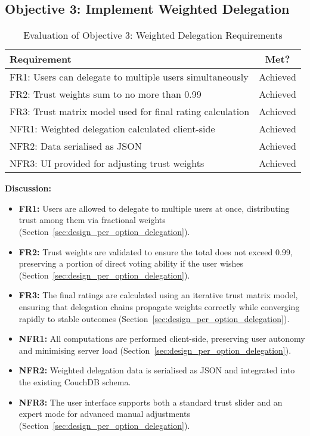 \subsection{Objective 3: Implement Weighted Delegation}

\begin{table}[H]
\centering
\begin{tabular}{|p{9cm}|c|}
\hline
\textbf{Requirement} & \textbf{Met?} \\ \hline
FR1: Users can delegate to multiple users simultaneously & Achieved \\ \hline
FR2: Trust weights sum to no more than 0.99 & Achieved \\ \hline
FR3: Trust matrix model used for final rating calculation & Achieved \\ \hline
NFR1: Weighted delegation calculated client-side & Achieved \\ \hline
NFR2: Data serialised as JSON & Achieved \\ \hline
NFR3: UI provided for adjusting trust weights & Achieved \\ \hline
\end{tabular}
\caption{Evaluation of Objective 3: Weighted Delegation Requirements}
\label{tab:objective3_requirements}
\end{table}

\textbf{Discussion:}

\begin{itemize}
    \item \textbf{FR1:} Users are allowed to delegate to multiple users at once, distributing trust among them via fractional weights (Section~\ref{sec:design_per_option_delegation}).
    \item \textbf{FR2:} Trust weights are validated to ensure the total does not exceed 0.99, preserving a portion of direct voting ability if the user wishes (Section~\ref{sec:design_per_option_delegation}).
    \item \textbf{FR3:} The final ratings are calculated using an iterative trust matrix model, ensuring that delegation chains propagate weights correctly while converging rapidly to stable outcomes (Section~\ref{sec:design_per_option_delegation}).
    \item \textbf{NFR1:} All computations are performed client-side, preserving user autonomy and minimising server load (Section~\ref{sec:design_per_option_delegation}).
    \item \textbf{NFR2:} Weighted delegation data is serialised as JSON and integrated into the existing CouchDB schema.
    \item \textbf{NFR3:} The user interface supports both a standard trust slider and an expert mode for advanced manual adjustments (Section~\ref{sec:design_per_option_delegation}).
\end{itemize}

